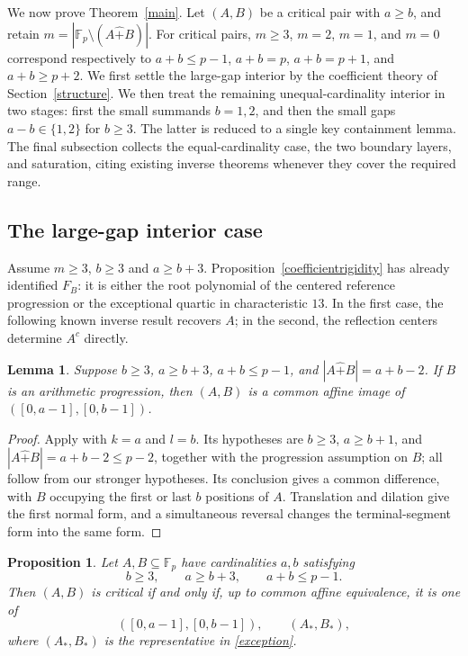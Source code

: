 \documentclass[12pt]{article}
\newtheorem{lemma}{Lemma}[section]
\newtheorem{proposition}{Proposition}[section]
\theoremstyle{remark}
\newcommand{\F}{\mathbb{F}_p}
\newcommand{\rs}{\mathbin{\widehat+}}
\begin{document}
We now prove Theorem~\ref{main}.  Let $(A,B)$ be a critical pair with
$a\ge b$, and retain $m=|\F\setminus(A\rs B)|$.  For critical pairs,
$m\ge3$, $m=2$, $m=1$, and $m=0$ correspond respectively to
$a+b\le p-1$, $a+b=p$, $a+b=p+1$, and $a+b\ge p+2$.
We first settle the large-gap interior by the coefficient theory of
Section~\ref{structure}.  We then treat the remaining unequal-cardinality
interior in two stages: first the small summands $b=1,2$, and then the
small gaps $a-b\in\{1,2\}$ for $b\ge3$.  The latter is reduced to a single
key containment lemma.  The final subsection collects the equal-cardinality
case, the two boundary layers, and saturation, citing existing inverse
theorems whenever they cover the required range.

\subsection{The large-gap interior case}\label{largegapinterior}

Assume $m\ge3$, $b\ge3$ and $a\ge b+3$.
Proposition~\ref{coefficientrigidity} has already identified $F_B$:
it is either the root polynomial of the centered reference progression
or the exceptional quartic in characteristic $13$.  In the first case,
the following known inverse result recovers $A$; in the second, the
reflection centers determine $A^c$ directly.

\begin{lemma}\label{allAPbridge}
Suppose $b\ge3$, $a\ge b+3$, $a+b\le p-1$, and
$|A\rs B|=a+b-2$.  If $B$ is an arithmetic progression, then $(A,B)$
is a common affine image of $([0,a-1],[0,b-1])$.
\end{lemma}
\begin{proof}
Apply \cite[Theorem 1.5(ii)]{LQ} with $k=a$ and $l=b$.
Its hypotheses are $b\ge3$, $a\ge b+1$, and
$|A\rs B|=a+b-2\le p-2$, together with the progression assumption
on $B$; all follow from our stronger hypotheses.  Its conclusion gives
a common difference, with $B$ occupying the first or last $b$ positions
of $A$.
Translation and dilation give the first normal form, and a simultaneous
reversal changes the terminal-segment form into the same form.
\end{proof}

\begin{proposition}\label{lg}
Let $A,B\subseteq\F$ have cardinalities $a,b$ satisfying
\[
 b\ge3,\qquad a\ge b+3,\qquad a+b\le p-1.
\]
Then $(A,B)$ is critical if and only if, up to common affine equivalence,
it is one of
\[
 ([0,a-1],[0,b-1]),\qquad (A_*,B_*),
\]
where $(A_*,B_*)$ is the representative in \eqref{exception}.
\end{proposition}
\end{document}
